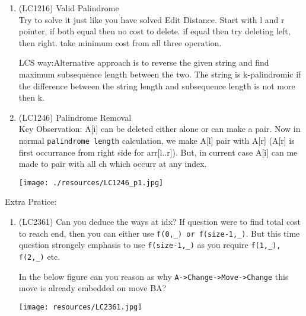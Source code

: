 \begin{exerciseHints}
\begin{enumerate}
        \item (LC1216) Valid Palindrome\\ Try to solve it just like you have solved Edit Distance. Start with l and r pointer, if both equal then no cost to delete. if equal then try deleting left, then right.
        take minimum cost from all three operation.

        LCS way:Alternative approach is to reverse the given string and find maximum subsequence length between the two. The string is k-palindromic if the difference between the string length and subsequence length is not more then k.
        
        \item (LC1246) Palindrome Removal \\Key Observation: A[i] can be deleted either alone or can make a pair. Now in normal \verb|palindrome length| calculation, we make A[l] pair with A[r] (A[r] is first occurrance from right side for arr[l..r]). But, in current case A[i] can me made to pair with all ch which occurr at any index.
        
        \texttt{[image: ./resources/LC1246\_p1.jpg]}
    \end{enumerate}

    Extra Pratice:
    \begin{enumerate}
        \item (LC2361) Can you deduce the ways at idx? If question were to find total cost to reach end, then you can either use \verb|f(0,_) or f(size-1,_)|. But this time question strongely emphasis to use \verb|f(size-1,_)| as you require \verb|f(1,_), f(2,_)| etc.
        
        In the below figure can you reason as why \verb|A->Change->Move->Change| this move is already embedded on move BA?
        
        \texttt{[image: resources/LC2361.jpg]}
        
    \end{enumerate}
    
\end{exerciseHints}